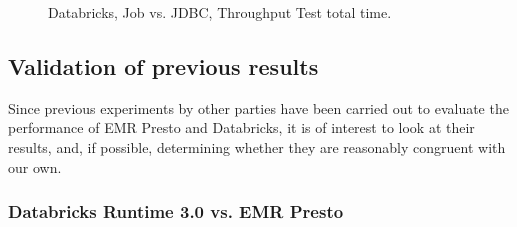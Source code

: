 \begin{figure}
   \begin{center}
   \end{center}
   \caption{Databricks, Job vs. JDBC, Throughput Test total time.}
   \label{fig:validationExperimentsDatabricksJDBCTputTest}
\end{figure}

\subsection{Validation of previous results}

Since previous experiments by other parties have been carried out to evaluate the performance of EMR Presto and Databricks, it is of interest to look at their results, and, if possible, determining whether they are reasonably congruent with our own.

\subsubsection{Databricks Runtime 3.0 vs. EMR Presto}



